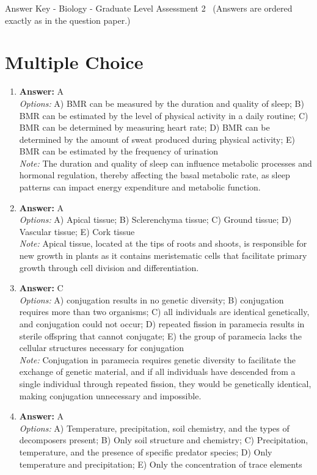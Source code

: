 \documentclass[12pt]{article}
\begin{document}
\begin{center}
Answer Key - Biology - Graduate Level Assessment 2 \
\small (Answers are ordered exactly as in the question paper.)
\end{center}

\section*{Multiple Choice}
\begin{enumerate}[label=\arabic*.]
\item \textbf{Answer:} A
\\ \textit{Options:} A) BMR can be measured by the duration and quality of sleep; B) BMR can be estimated by the level of physical activity in a daily routine; C) BMR can be determined by measuring heart rate; D) BMR can be determined by the amount of sweat produced during physical activity; E) BMR can be estimated by the frequency of urination
\\ \textit{Note:} The duration and quality of sleep can influence metabolic processes and hormonal regulation, thereby affecting the basal metabolic rate, as sleep patterns can impact energy expenditure and metabolic function.
\item \textbf{Answer:} A
\\ \textit{Options:} A) Apical tissue; B) Sclerenchyma tissue; C) Ground tissue; D) Vascular tissue; E) Cork tissue
\\ \textit{Note:} Apical tissue, located at the tips of roots and shoots, is responsible for new growth in plants as it contains meristematic cells that facilitate primary growth through cell division and differentiation.
\item \textbf{Answer:} C
\\ \textit{Options:} A) conjugation results in no genetic diversity; B) conjugation requires more than two organisms; C) all individuals are identical genetically, and conjugation could not occur; D) repeated fission in paramecia results in sterile offspring that cannot conjugate; E) the group of paramecia lacks the cellular structures necessary for conjugation
\\ \textit{Note:} Conjugation in paramecia requires genetic diversity to facilitate the exchange of genetic material, and if all individuals have descended from a single individual through repeated fission, they would be genetically identical, making conjugation unnecessary and impossible.
\item \textbf{Answer:} A
\\ \textit{Options:} A) Temperature, precipitation, soil chemistry, and the types of decomposers present; B) Only soil structure and chemistry; C) Precipitation, temperature, and the presence of specific predator species; D) Only temperature and precipitation; E) Only the concentration of trace elements

\end{enumerate}
\end{document}
